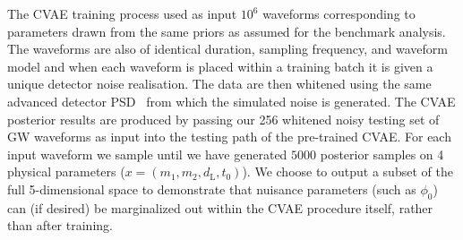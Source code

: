 \documentclass[%
showpacs,
 amsmath,amssymb,
 aps,
 twocolumn,
 prl,
 reprint,
floatfix,
]{revtex4-1}
\begin{document}
%
%
The \ac{CVAE} training process used as input $10^{6}$ waveforms corresponding
to parameters drawn from the same priors as assumed for the benchmark analysis.
The waveforms are also of identical duration, sampling frequency, and waveform
model and when each waveform is placed within a training batch it is given a
unique detector noise realisation. The data are then whitened using the same
advanced detector \ac{PSD}~\cite{2016LRR....19....1A} from which the simulated
noise is generated. The \ac{CVAE} posterior results are produced by passing our
256 whitened noisy testing set of \ac{GW} waveforms as input into the testing
path of the pre-trained \ac{CVAE}. For each input waveform we sample until we
have generated $5000$ posterior samples on 4 physical parameters
($x=(m_1,m_2,d_{\text{L}},t_{0})$). We choose to output a subset of the full
5-dimensional space to demonstrate that nuisance parameters (such as $\phi_0$)
can (if desired) be marginalized out within the \ac{CVAE} procedure itself,
rather than after training. 
\end{document}
